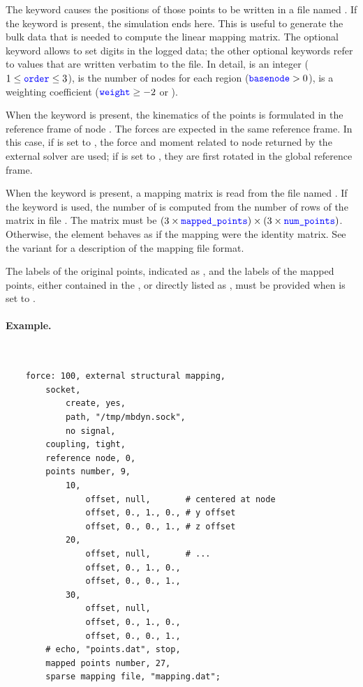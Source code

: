 The  keyword causes the positions of those points
to be written in a file named .
If the keyword  is present, the simulation ends here.
This is useful to generate the bulk data that is needed to compute
the linear mapping matrix.
The optional keyword  allows to set 
digits in the logged data; the other optional keywords refer to values
that are written verbatim to the file.
In detail,  is an integer ($1 \le \textcolor{blue}{\texttt{order}} \le 3$),
 is the number of nodes for each region ($\textcolor{blue}{\texttt{basenode}} > 0$),
 is a weighting coefficient ($\textcolor{blue}{\texttt{weight}} \ge -2$ or ).

When the  keyword is present, the kinematics
of the points is formulated in the reference frame of node
.
The forces are expected in the same reference frame.
In this case, if  is set to ,
the force and moment related to node  
returned by the external solver are used;
if  is set to ,
they are first rotated in the global reference frame.

When the  keyword is present,
a mapping matrix is read from the file named .
If the keyword  is used, the number of 
is computed from the number of rows of the matrix
in file .
The matrix must be
$(3 \times \textcolor{blue}{\texttt{mapped\_points}}) \times (3 \times \textcolor{blue}{\texttt{num\_points}})$.
Otherwise, the element behaves as if the mapping were the identity matrix.
See the 
variant for a description of the mapping file format.

The labels of the original points, indicated as ,
and the labels of the mapped points, either contained
in the ,
or directly listed as , must be provided
when  is set to .

\paragraph{Example.} \
\begin{verbatim}
    force: 100, external structural mapping,
        socket,
            create, yes,
            path, "/tmp/mbdyn.sock",
            no signal,
        coupling, tight,
        reference node, 0,
        points number, 9,
            10,
                offset, null,       # centered at node
                offset, 0., 1., 0., # y offset
                offset, 0., 0., 1., # z offset
            20,
                offset, null,       # ...
                offset, 0., 1., 0.,
                offset, 0., 0., 1.,
            30,
                offset, null,
                offset, 0., 1., 0.,
                offset, 0., 0., 1.,
        # echo, "points.dat", stop,
        mapped points number, 27,
        sparse mapping file, "mapping.dat";
\end{verbatim}

